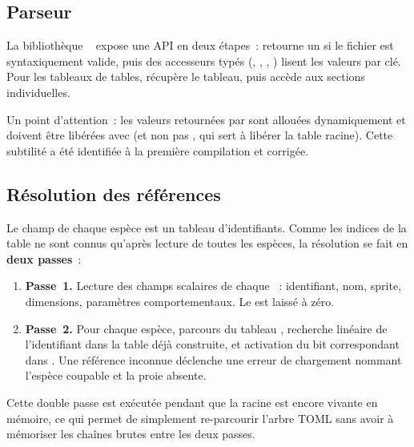 \subsection{Parseur }

La bibliothèque ~\cite{tomlc99} expose une API en
deux étapes~:  retourne un
 si le fichier est syntaxiquement valide,
puis des accesseurs typés (,
, ,
) lisent les valeurs par clé. Pour les
tableaux de tables,  récupère le tableau,
puis  accède aux sections individuelles.

Un point d'attention~: les valeurs  retournées par
 sont allouées dynamiquement et doivent être
libérées avec  (et non pas ,
qui sert à libérer la table racine). Cette subtilité a été
identifiée à la première compilation et corrigée.

\subsection{Résolution des références }

Le champ  de chaque espèce est un tableau d'identifiants.
Comme les indices de la table  ne sont connus
qu'après lecture de toutes les espèces, la résolution se fait en
\textbf{deux passes}~:

\begin{enumerate}
  \item \textbf{Passe~1.} Lecture des champs scalaires de chaque
    \code{[[species]]}~: identifiant, nom, sprite, dimensions,
    paramètres comportementaux. Le  est laissé à
    zéro.
  \item \textbf{Passe~2.} Pour chaque espèce, parcours du tableau
    , recherche linéaire de l'identifiant dans la table
    déjà construite, et activation du bit correspondant dans
    . Une référence inconnue déclenche une erreur
    de chargement nommant l'espèce coupable et la proie absente.
\end{enumerate}

Cette double passe est exécutée pendant que la 
racine est encore vivante en mémoire, ce qui permet de simplement
re-parcourir l'arbre TOML sans avoir à mémoriser les chaînes brutes
entre les deux passes.

